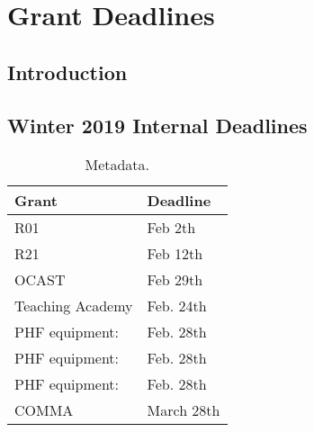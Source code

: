 
\chapter{Grant Deadlines}

\section{Introduction}


\section{Winter 2019 Internal Deadlines}
\begin{table}[htp]
\caption{Metadata.}
\label{tab:grantGeadlne}
\begin{center}
\begin{tabular}{ll}
\toprule
Grant & Deadline \\
\midrule
R01 & Feb 2th \\
R21 & Feb 12th \\
OCAST & Feb 29th \\
Teaching Academy & Feb. 24th \\
PHF equipment: & Feb. 28th  \\ 
PHF equipment: & Feb. 28th  \\ 
PHF equipment: & Feb. 28th  \\ 
COMMA & March 28th \\
\bottomrule
\end{tabular}
\end{center}
\end{table}